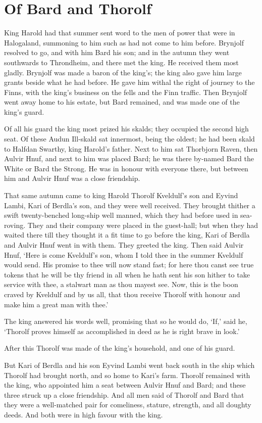 \chapter{Of Bard and Thorolf}
King Harold had that summer sent word to the men of power that were in Halogaland, summoning to him such as had not come to him before. Brynjolf resolved to go, and with him Bard his son; and in the autumn they went southwards to Throndheim, and there met the king. He received them most gladly. Brynjolf was made a baron of the king's; the king also gave him large grants beside what he had before. He gave him withal the right of journey to the Finns, with the king's business on the fells and the Finn traffic. Then Brynjolf went away home to his estate, but Bard remained, and was made one of the king's guard.

Of all his guard the king most prized his skalds; they occupied the second high seat. Of these Audun Ill-skald sat innermost, being the oldest; he had been skald to Halfdan Swarthy, king Harold's father. Next to him sat Thorbjorn Raven, then Aulvir Hnuf, and next to him was placed Bard; he was there by-named Bard the White or Bard the Strong. He was in honour with everyone there, but between him and Aulvir Hnuf was a close friendship.

That same autumn came to king Harold Thorolf Kveldulf's son and Eyvind Lambi, Kari of Berdla's son, and they were well received. They brought thither a swift twenty-benched long-ship well manned, which they had before used in sea-roving. They and their company were placed in the guest-hall; but when they had waited there till they thought it a fit time to go before the king, Kari of Berdla and Aulvir Hnuf went in with them. They greeted the king. Then said Aulvir Hnuf, `Here is come Kveldulf's son, whom I told thee in the summer Kveldulf would send. His promise to thee will now stand fast; for here thou canst see true tokens that he will be thy friend in all when he hath sent his son hither to take service with thee, a stalwart man as thou mayest see. Now, this is the boon craved by Kveldulf and by us all, that thou receive Thorolf with honour and make him a great man with thee.'

The king answered his words well, promising that so he would do, `If,' said he, `Thorolf proves himself as accomplished in deed as he is right brave in look.'

After this Thorolf was made of the king's household, and one of his guard.

But Kari of Berdla and his son Eyvind Lambi went back south in the ship which Thorolf had brought north, and so home to Kari's farm. Thorolf remained with the king, who appointed him a seat between Aulvir Hnuf and Bard; and these three struck up a close friendship. And all men said of Thorolf and Bard that they were a well-matched pair for comeliness, stature, strength, and all doughty deeds. And both were in high favour with the king.

